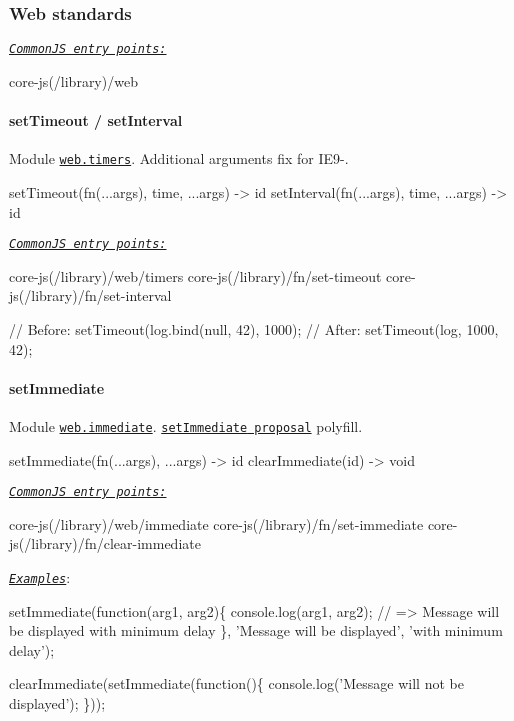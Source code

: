 \subsubsection*{Web standards}

\href{#commonjs}{\tt {\itshape Common\+JS entry points\+:}} 
\begin{DoxyCode}
core-js(/library)/web
\end{DoxyCode}
 \paragraph*{set\+Timeout / set\+Interval}

Module \href{https://github.com/zloirock/core-js/blob/v2.6.0/modules/web.timers.js}{\tt {\ttfamily web.\+timers}}. Additional arguments fix for I\+E9-\/. 
\begin{DoxyCode}
setTimeout(fn(...args), time, ...args) -> id
setInterval(fn(...args), time, ...args) -> id
\end{DoxyCode}
 \href{#commonjs}{\tt {\itshape Common\+JS entry points\+:}} 
\begin{DoxyCode}
core-js(/library)/web/timers
core-js(/library)/fn/set-timeout
core-js(/library)/fn/set-interval
\end{DoxyCode}
 
\begin{DoxyCode}
// Before:
setTimeout(log.bind(null, 42), 1000);
// After:
setTimeout(log, 1000, 42);
\end{DoxyCode}
 \paragraph*{set\+Immediate}

Module \href{https://github.com/zloirock/core-js/blob/v2.6.0/modules/web.immediate.js}{\tt {\ttfamily web.\+immediate}}. \href{https://developer.mozilla.org/en-US/docs/Web/API/Window.setImmediate}{\tt {\ttfamily set\+Immediate} proposal} polyfill. 
\begin{DoxyCode}
setImmediate(fn(...args), ...args) -> id
clearImmediate(id) -> void
\end{DoxyCode}
 \href{#commonjs}{\tt {\itshape Common\+JS entry points\+:}} 
\begin{DoxyCode}
core-js(/library)/web/immediate
core-js(/library)/fn/set-immediate
core-js(/library)/fn/clear-immediate
\end{DoxyCode}
 \href{http://goo.gl/6nXGrx}{\tt {\itshape Examples}}\+: 
\begin{DoxyCode}
setImmediate(function(arg1, arg2)\{
  console.log(arg1, arg2); // => Message will be displayed with minimum delay
\}, 'Message will be displayed', 'with minimum delay');

clearImmediate(setImmediate(function()\{
  console.log('Message will not be displayed');
\}));
\end{DoxyCode}
